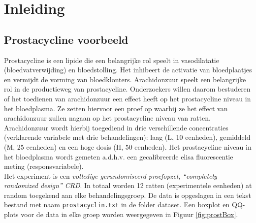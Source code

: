 \documentclass[12pt,dutch,coursenotes]{book}
\theoremstyle{definition}
\theoremstyle{definition}
\theoremstyle{definition}
\theoremstyle{remark}
\begin{document}
\section{Inleiding}\label{inleiding-5}

\subsection{Prostacycline voorbeeld}\label{prostacycline-voorbeeld}

Prostacycline is een lipide die een belangrijke rol speelt in
vasodilatatie (bloedvatverwijding) en bloedstolling. Het inhibeert de
activatie van bloedplaatjes en vermijdt de vorming van bloedklonters.
Arachidonzuur speelt een belangrijke rol in de productieweg van
prostacycline. Onderzoekers willen daarom bestuderen of het toedienen
van arachidonzuur een effect heeft op het prostacycline niveau in het
bloedplasma. Ze zetten hiervoor een proef op waarbij ze het effect van
arachidonzuur zullen nagaan op het prostacycline niveau van ratten.
Arachidonzuur wordt hierbij toegediend in drie verschillende
concentraties (verklarende variabele met drie behandelingen): laag (L,
10 eenheden), gemiddeld (M, 25 eenheden) en een hoge dosis (H, 50
eenheden). Het prostacycline niveau in het bloedplasma wordt gemeten
a.d.h.v. een gecalibreerde elisa fluorescentie meting
(responsvariabele).\\
Het experiment is een \emph{volledige gerandomiseerd proefopzet},
\emph{``completely randomized design'' CRD}. In totaal worden 12 ratten
(experimentele eenheden) at random toegekend aan elke behandelingsgroep.
De data is opgeslagen in een tekst bestand met naam
\texttt{prostacyclin.txt} in de folder dataset. Een boxplot en QQ-plots
voor de data in elke groep worden weergegeven in Figuur
\ref{fig:prostBox}.
\end{document}
